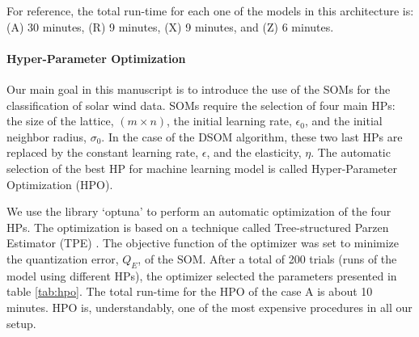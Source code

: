 For reference, the total run-time for each one of the models in this architecture is: (A) 30 minutes, (R) 9 minutes, (X) 9 minutes, and (Z) 6 minutes.

\paragraph{Hyper-Parameter Optimization}
Our main goal in this manuscript is to introduce the use of the SOMs for the classification of solar wind data. SOMs require the selection of four main HPs: the size of the lattice, $(m\times n)$, the initial learning rate, $\epsilon_0$, and the initial neighbor radius, $\sigma_0$. In the case of the DSOM algorithm, these two last HPs are replaced by the constant learning rate, $\epsilon$, and the elasticity, $\eta$. The automatic selection of the best HP for machine learning model is called Hyper-Parameter Optimization (HPO).

We use the library `optuna' \citep{Akiba2019} to perform an automatic optimization of the four HPs. The optimization is based on a technique called Tree-structured Parzen Estimator (TPE) \citep{pmlr-v28-bergstra13}. The objective function of the optimizer was set to minimize the quantization error, $Q_E$, of the SOM. After a total of 200 trials (runs of the model using different HPs), the optimizer selected the parameters presented in table \ref{tab:hpo}. The total run-time for the HPO of the case A is about 10 minutes. HPO is, understandably, one of the most expensive procedures in all our setup.